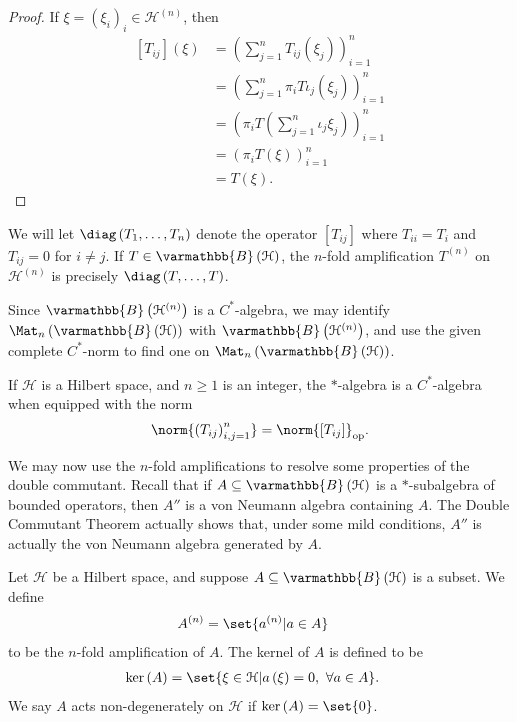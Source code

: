 \documentclass[10pt]{mypackage}
\renewcommand*{\mathbb}[1]{\varmathbb{#1}}
\newcommand{\B}{\mathbb{B}}
\begin{document}
\begin{proof}
  If $\xi = \left(\xi_i\right)_i \in \mathcal{H}^{(n)}$, then
  \begin{align*}
    \left[T_{ij}\right]\left(\xi\right) &= \left(\sum_{j=1}^{n}T_{ij}\left(\xi_j\right)\right)_{i=1}^{n}\\
                                        &= \left(\sum_{j=1}^{n}\pi_iT\iota_j\left(\xi_j\right)\right)_{i=1}^{n}\\
                                        &= \left(\pi_iT\left(\sum_{j=1}^{n}\iota_j\xi_j\right)\right)_{i=1}^{n}\\
                                        &= \left(\pi_iT\left(\xi\right)\right)_{i=1}^{n}\\
                                        &= T\left(\xi\right).
  \end{align*}
\end{proof}
\begin{remark}
  We will let $\diag\left(T_1,\dots,T_n\right)$ denote the operator $\left[T_{ij}\right]$ where $T_{ii} = T_i$ and $T_{ij} = 0$ for $i\neq j$. If $T\in \B\left(\mathcal{H}\right)$, the $n$-fold amplification $T^{(n)}$ on $\mathcal{H}^{(n)}$ is precisely $\diag\left(T,\dots,T\right)$.
\end{remark}
Since $\B\left(\mathcal{H}^{(n)}\right)$ is a $C^{\ast}$-algebra, we may identify $\Mat_{n}\left(\B\left(\mathcal{H}\right)\right)$ with $\B\left(\mathcal{H}^{(n)}\right)$, and use the given complete $C^{\ast}$-norm to find one on $\Mat_{n}\left(\B\left(\mathcal{H}\right)\right)$.
\begin{corollary}[]
  If $\mathcal{H}$ is a Hilbert space, and $n\geq 1$ is an integer, the $\ast$-algebra is a $C^{\ast}$-algebra when equipped with the norm
  \begin{align*}
    \norm{\left(T_{ij}\right)_{i,j=1}^{n}} = \norm{\left[T_{ij}\right]}_{\text{op}}.
  \end{align*}
\end{corollary}
We may now use the $n$-fold amplifications to resolve some properties of the double commutant. Recall that if $A\subseteq \B\left(\mathcal{H}\right)$ is a $\ast$-subalgebra of bounded operators, then $A''$ is a von Neumann algebra containing $A$. The Double Commutant Theorem actually shows that, under some mild conditions, $A''$ is actually the von Neumann algebra generated by $A$.
\begin{definition}[]
  Let $\mathcal{H}$ be a Hilbert space, and suppose $A\subseteq \B\left(\mathcal{H}\right)$ is a subset. We define
  \begin{align*}
    A^{(n)} &= \set{a^{(n)} | a\in A}
  \end{align*}
  to be the $n$-fold amplification of $A$. The kernel of $A$ is defined to be
  \begin{align*}
    \ker\left(A\right) &= \set{\xi\in \mathcal{H} | a\left(\xi\right) = 0,~\forall a\in A}.
  \end{align*}
  We say $A$ acts non-degenerately on $\mathcal{H}$ if $\ker\left(A\right) = \set{0}$.
\end{definition}
\end{document}
